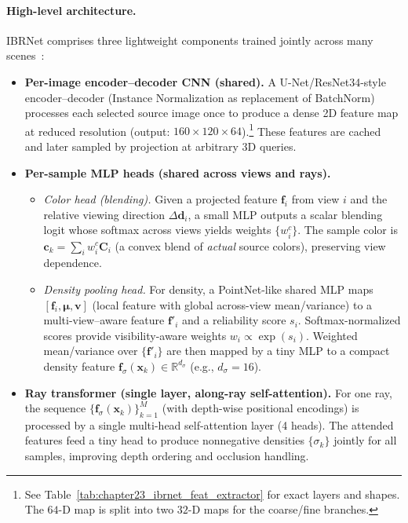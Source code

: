 \begin{enrichment}
\begin{enrichment}
     \paragraph{High-level architecture.}
     IBRNet comprises three lightweight components trained jointly across many scenes~\cite{wang2021_ibrnet}:
     \begin{itemize}
         \item \textbf{Per-image encoder--decoder CNN (shared).} A U-Net/ResNet34-style encoder--decoder (Instance Normalization as replacement of BatchNorm) processes each selected source image once to produce a dense 2D feature map at reduced resolution (output: $160\!\times\!120\!\times\!64$).\footnote{See Table~\ref{tab:chapter23_ibrnet_feat_extractor} for exact layers and shapes. The $64$-D map is split into two $32$-D maps for the coarse/fine branches.} These features are cached and later sampled by projection at arbitrary 3D queries.
         \item \textbf{Per-sample MLP heads (shared across views and rays).}
         \begin{itemize}
             \item \emph{Color head (blending).} Given a projected feature $\mathbf{f}_i$ from view $i$ and the relative viewing direction $\Delta\mathbf{d}_i$, a small MLP outputs a scalar blending logit whose softmax across views yields weights $\{w_i^c\}$. The sample color is $\mathbf{c}_k=\sum_i w_i^c \mathbf{C}_i$ (a convex blend of \emph{actual} source colors), preserving view dependence.
             \item \emph{Density pooling head.} For density, a PointNet-like shared MLP maps $[\mathbf{f}_i,\boldsymbol{\mu},\mathbf{v}]$ (local feature with global across-view mean/variance) to a multi-view--aware feature $\mathbf{f}'_i$ and a reliability score $s_i$. Softmax-normalized scores provide visibility-aware weights $w_i\!\propto\!\exp(s_i)$. Weighted mean/variance over $\{\mathbf{f}'_i\}$ are then mapped by a tiny MLP to a compact density feature $\mathbf{f}_\sigma(\mathbf{x}_k)\!\in\!\mathbb{R}^{d_\sigma}$ (e.g., $d_\sigma{=}16$).
         \end{itemize}
         \item \textbf{Ray transformer (single layer, along-ray self-attention).} For one ray, the sequence $\{\mathbf{f}_\sigma(\mathbf{x}_k)\}_{k=1}^{M}$ (with depth-wise positional encodings) is processed by a single multi-head self-attention layer (4 heads). The attended features feed a tiny head to produce nonnegative densities $\{\sigma_k\}$ jointly for all samples, improving depth ordering and occlusion handling.
     \end{itemize}
     

\end{enrichment}
\end{enrichment}
